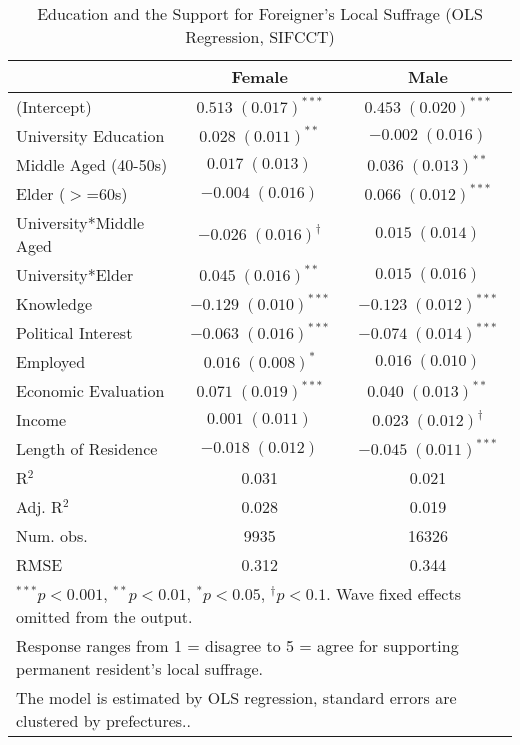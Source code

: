 
\begin{table}
\caption{Education and the Support for Foreigner's Local Suffrage (OLS Regression, SIFCCT)}
\begin{center}
\begin{tabular}{l c c }
\toprule
 & Female & Male \\
\midrule
(Intercept)            & $0.513 \; (0.017)^{***}$      & $0.453 \; (0.020)^{***}$     \\
University Education   & $0.028 \; (0.011)^{**}$       & $-0.002 \; (0.016)$          \\
Middle Aged (40-50s)   & $0.017 \; (0.013)$            & $0.036 \; (0.013)^{**}$      \\
Elder ($>$=60s)        & $-0.004 \; (0.016)$           & $0.066 \; (0.012)^{***}$     \\
University*Middle Aged & $-0.026 \; (0.016)^{\dagger}$ & $0.015 \; (0.014)$           \\
University*Elder       & $0.045 \; (0.016)^{**}$       & $0.015 \; (0.016)$           \\
Knowledge              & $-0.129 \; (0.010)^{***}$     & $-0.123 \; (0.012)^{***}$    \\
Political Interest     & $-0.063 \; (0.016)^{***}$     & $-0.074 \; (0.014)^{***}$    \\
Employed               & $0.016 \; (0.008)^{*}$        & $0.016 \; (0.010)$           \\
Economic Evaluation    & $0.071 \; (0.019)^{***}$      & $0.040 \; (0.013)^{**}$      \\
Income                 & $0.001 \; (0.011)$            & $0.023 \; (0.012)^{\dagger}$ \\
Length of Residence    & $-0.018 \; (0.012)$           & $-0.045 \; (0.011)^{***}$    \\
\midrule
R$^2$                  & 0.031                         & 0.021                        \\
Adj. R$^2$             & 0.028                         & 0.019                        \\
Num. obs.              & 9935                          & 16326                        \\
RMSE                   & 0.312                         & 0.344                        \\
\bottomrule
\multicolumn{3}{l}{\scriptsize{$^{***}p<0.001$, $^{**}p<0.01$, $^*p<0.05$, $^{\dagger}p<0.1$. Wave fixed effects omitted from the output.}} \\ \multicolumn{3}{l}{\scriptsize{Response ranges from 1 = disagree to 5 = agree for supporting permanent resident's local suffrage.}} \\ \multicolumn{3}{l}{\scriptsize{The model is estimated by OLS regression, standard errors are clustered by prefectures..}}
\end{tabular}
\label{lmtab_smo}
\end{center}
\end{table}

